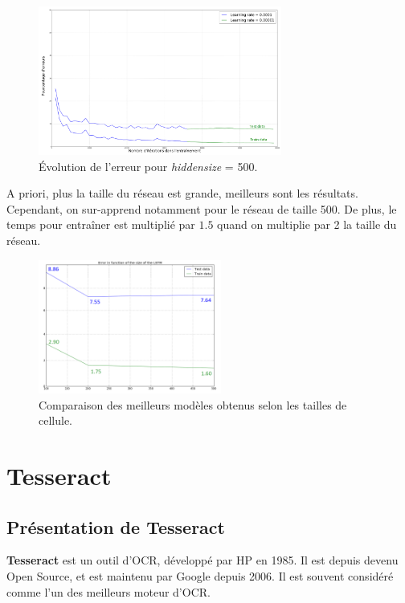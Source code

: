 \documentclass{report}
\begin{document}
\begin{figure}[!h] 
	\center
	\includegraphics[width=8cm]{img/curve_500.png}
	\caption{Évolution de l'erreur pour \textit{hiddensize} = 500.}
	\label{err_size500}
\end{figure}

A priori, plus la taille du réseau est grande, meilleurs sont les résultats. Cependant, on sur-apprend notamment pour le réseau de taille 500. De plus, le temps pour entraîner est multiplié par $1.5$ quand on multiplie par 2 la taille du réseau.

\begin{figure}[!h] 
	\center
	\includegraphics[width=6cm]{img/curves.png}
	\caption{Comparaison des meilleurs modèles obtenus selon les tailles de cellule.}
	\label{err_size_compare}
\end{figure}


\FloatBarrier
\newpage
\newpage

\section{Tesseract}

\subsection{Présentation de Tesseract}

\textbf{Tesseract} est un outil d'OCR, développé par HP en 1985.
Il est depuis devenu Open Source, et est maintenu par Google depuis 2006.
Il est souvent considéré comme l'un des meilleurs moteur d'OCR.
\end{document}
